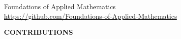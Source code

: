 \newpage 
\setcounter{page}{1}
\thispagestyle{empty}
\vspace{-3em}

\vspace{-2em}

\begin{center}
 {\fontsize{24pt}{22pt}\selectfont \textcolor{titletextcolour}{Foundations of Applied Mathematics}} \\ 
{\fontsize{16pt}{20pt}\selectfont \textcolor{titlemainbgcolour}{\url{https://github.com/Foundations-of-Applied-Mathematics}}} 
\end{center}

\setlength{\parskip}{0pt}

\vfill

\begin{center}
\fontsize{14pt}{16pt}\selectfont\textcolor{titletextcolour}{\textbf{CONTRIBUTIONS}}
\end{center}

